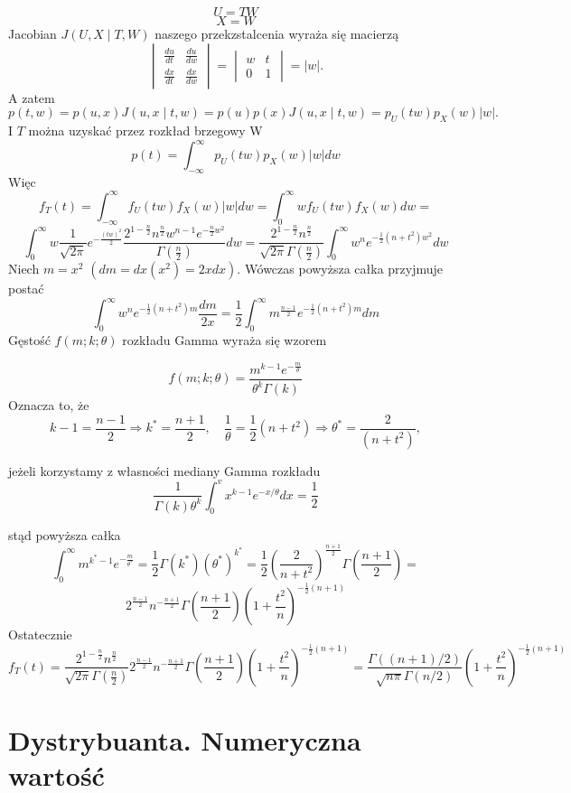 \documentclass[12pt]{article}
\begin{document}
$$U = TW$$
$$X = W$$
Jacobian $J(U,X\mid T,W)$ naszego przekzstalcenia wyraża się macierzą
$$\begin{vmatrix}{\frac {du}{dt}}&{\frac {du}{dw}}\\
{\frac {dx}{dt}}&{\frac {dx}{dw}}\end{vmatrix}=
{\begin{vmatrix}w&t\\0&1\end{vmatrix}}=|w|. $$
A zatem
$$ p(t,w)=p(u,x)J(u,x\mid t,w)=
p(u)p(x)J(u,x\mid t,w)=p_{U}(tw)p_{X}(w)|w|.  $$
I $T$ można uzyskać przez rozkład brzegowy W
$$p(t)=\int _{-\infty }^{\infty }p_{U}(tw)p_{X}(w)|w|dw $$
Więc 
$$ f_{T}(t)=\int _{-\infty }^{\infty }f_{U}(tw)f_{X}(w)|w|dw =
   \int _{0 }^{\infty }wf_{U}(tw)f_{X}(w)dw = $$
  $$ \int _{0 }^{\infty }w \frac{1}{\sqrt{2\pi}}e^{-\frac{(tw)^2}{2}} 
   \frac{2^{1-\frac{n}{2}}n^{\frac{n}{2}}w^{n-1}e^{-\frac{n}{2}w^{2}}}{\Gamma(\frac{n}{2})}dw  =  
   \frac{2^{1-\frac{n}{2}}n^{\frac{n}{2}}}{\sqrt{2\pi}\Gamma(\frac{n}{2})}
   \int _{0 }^{\infty } w^{n}e^{-\frac{1}{2}(n+t^{2})w^{2}}dw $$
Niech $m = x^{2}$ $(dm=dx(x^{2})=2xdx)$. Wówczas powyższa całka przyjmuje postać
$$ \int _{0 }^{\infty } w^{n}e^{-\frac{1}{2}(n+t^{2})m}\frac{dm}{2x}=
	\frac{1}{2}\int _{0 }^{\infty }m^{\frac{n-1}{2}}e^{-\frac{1}{2}(n+t^{2})m}dm $$
Gęstość $f(m;k;\theta)$ rozkładu Gamma wyraża się wzorem

$$ f(m;k;\theta)=\frac{m^{k-1}e^{-\frac{m}{\theta}}}{\theta^{k}\Gamma(k)} $$
Oznacza to, że
$$ k-1 = \frac{n-1}{2} \Rightarrow k^* = \frac{n+1}{2}, \quad 
\frac{1}{\theta} = \frac{1}{2}(n+t^2)\Rightarrow\theta^*=\frac{2}{(n+t^2)},$$

jeżeli korzystamy z własności mediany Gamma rozkładu
$$ \frac{1}{\Gamma(k)\theta^k}\int _{0}^{v} x^{k-1}e^{-x/\theta}dx = \frac{1}{2} $$

stąd powyższa całka 
$$ \int _{0 }^{\infty } m^{k^*-1}e^{-\frac{m}{\theta^*}} = 
	\frac{1}{2}\Gamma(k^*)(\theta^*)^{k^*} = 
	\frac{1}{2}(\frac{2}{n+t^2})^\frac{n+1}{2}\Gamma(\frac{n+1}{2}) =$$
$$ 2^{\frac{n-1}{2}}n^{-\frac{n+1}{2}}\Gamma(\frac{n+1}{2})(1+\frac{t^2}{n})^{-\frac{1}{2}(n+1)}$$
Ostatecznie
$$ f_{T}(t)= \frac{2^{1-\frac{n}{2}}n^{\frac{n}{2}}}{\sqrt{2\pi}\Gamma(\frac{n}{2})}
2^{\frac{n-1}{2}}n^{-\frac{n+1}{2}}\Gamma(\frac{n+1}{2})(1+\frac{t^2}{n})^{-\frac{1}{2}(n+1)}= 
\frac{\Gamma((n+1)/2)}{\sqrt{n\pi}\Gamma(n/2)}(1+\frac{t^2}{n})^{-\frac{1}{2}(n+1)} $$
\section*{Dystrybuanta.  Numeryczna wartość}
\end{document}
